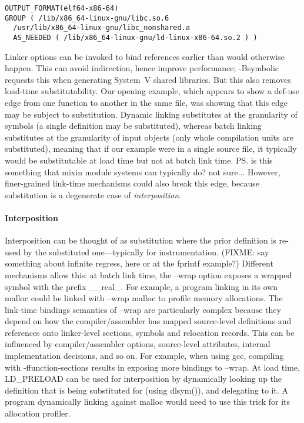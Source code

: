 {\scriptsize\begin{lstlisting}[language=plain,basicstyle=\sffamily,columns=flexible]
OUTPUT_FORMAT(elf64-x86-64)
GROUP ( /lib/x86_64-linux-gnu/libc.so.6 
  /usr/lib/x86_64-linux-gnu/libc_nonshared.a
  AS_NEEDED ( /lib/x86_64-linux-gnu/ld-linux-x86-64.so.2 ) )
\end{lstlisting}}

Linker options can be invoked to bind references earlier than would otherwise happen.
This can avoid indirection, hence improve performance; \textsf{-Bsymbolic} 
requests this when generating System~V shared libraries.
But this also removes load-time substitutability.
Our opening example, which appears to show a def-use edge
from one function to another in the same file, 
was showing that this edge may be subject to substitution.
Dynamic linking substitutes at the granularity of symbols
(a single definition may be substituted),
whereas batch linking substitutes at the granularity of input objects
(only whole compilation units are substituted),
meaning that if our example were in a single source file, it typically
would be substitutable at load time but not at batch link time.
\ps{is this something that mixin module systems can typically do? not sure...}
However, finer-grained link-time mechanisms could 
also break this edge, because substitution is a degenerate case of \emph{interposition}.

\paragraph{Interposition}
Interposition can be thought of as substitution where the prior definition
is re-used by the substituted one---typically for instrumentation.
(FIXME: say something about infinite regress, here or at the fprintf example?)
Different mechanisms allow this:
at batch link time, the \textsf{--wrap} option exposes a wrapped symbol
with the prefix \textsf{\_\_real\_}.
For example, a program linking in its own \textsf{malloc} 
could be linked with \textsf{--wrap} \textsf{malloc} to profile memory allocations.
The link-time bindings semantics of \textsf{--wrap} are particularly complex because they depend on how the compiler/assembler has mapped source-level definitions and references onto linker-level sections, symbols and relocation records.
This can be influenced by compiler/assembler options, 
source-level attributes, internal implementation decisions, and so on.
For example, when using \textsf{gcc}, compiling with \textsf{-ffunction-sections} results in exposing more bindings to \textsf{--wrap}.
At load time, \textsf{LD\_PRELOAD} can be used for interposition by dynamically looking up the definition that is being substituted for (using \textsf{dlsym()}), and delegating to it. A program dynamically linking against \textsf{malloc} would need to use this trick for its allocation profiler. 

